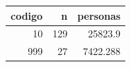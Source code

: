 \begin{tabular}{rrr}
\toprule
codigo & n & personas \\
\midrule
10 & 129 & 25823.9 \\
999 & 27 & 7422.288 \\
\bottomrule
\end{tabular}
